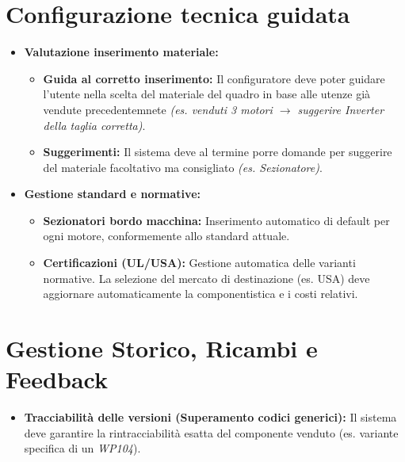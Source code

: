 \documentclass[12pt, a4paper]{article} %
\begin{document}
\section{Configurazione tecnica guidata}
\begin{itemize}
      \item \textbf{Valutazione inserimento materiale:}
            \begin{itemize}
                  \item \textbf{Guida al corretto inserimento:}
                        Il configuratore deve poter guidare l'utente nella scelta del materiale del quadro in base alle utenze già vendute precedentemnete \textit{(es. venduti 3 motori $\rightarrow$ suggerire Inverter della taglia corretta)}.
                  \item \textbf{Suggerimenti:} Il sistema deve al termine porre domande per suggerire del materiale facoltativo ma consigliato \textit{(es. Sezionatore)}.
            \end{itemize}
      \item \textbf{Gestione standard e normative:}
            \begin{itemize}
                  \item \textbf{Sezionatori bordo macchina:} Inserimento automatico di default per ogni motore, conformemente allo standard attuale.
                  \item \textbf{Certificazioni (UL/USA):} Gestione automatica delle varianti normative. La selezione del mercato di destinazione (es. USA)
                        deve aggiornare automaticamente la componentistica e i costi relativi.
            \end{itemize}
\end{itemize}

\section{Gestione Storico, Ricambi e Feedback}
\begin{itemize}
      \item \textbf{Tracciabilità delle versioni (Superamento codici generici):}
            Il sistema deve garantire la rintracciabilità esatta del componente venduto (es. variante specifica di un \textit{WP104}).

\end{itemize}
\end{document}
